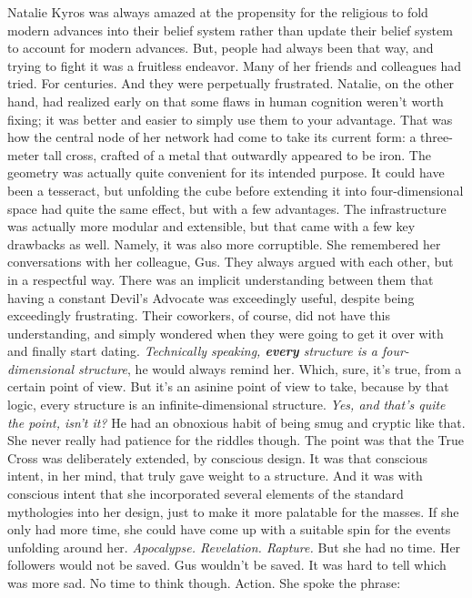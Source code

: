 Natalie Kyros was always amazed at the propensity for the religious to fold modern advances into their belief system rather than update their belief system to account for modern advances. But, people had always been that way, and trying to fight it was a fruitless endeavor. Many of her friends and colleagues had tried. For centuries. And they were perpetually frustrated.
\SmallVSpace
Natalie, on the other hand, had realized early on that some flaws in human cognition weren’t worth fixing; it was better and easier to simply use them to your advantage. That was how the central node of her network had come to take its current form: a three-meter tall cross, crafted of a metal that outwardly appeared to be iron.
\SmallVSpace
The geometry was actually quite convenient for its intended purpose. It could have been a tesseract, but unfolding the cube before extending it into four-dimensional space had quite the same effect, but with a few advantages. The infrastructure was actually more modular and extensible, but that came with a few key drawbacks as well. Namely, it was also more corruptible.
\SmallVSpace
She remembered her conversations with her colleague, Gus. They always argued with each other, but in a respectful way. There was an implicit understanding between them that having a constant Devil’s Advocate was exceedingly useful, despite being exceedingly frustrating. Their coworkers, of course, did not have this understanding, and simply wondered when they were going to get it over with and finally start dating.
\SmallVSpace
\emph{Technically speaking, \textbf{every} structure is a four-dimensional structure}, he would always remind her. Which, sure, it’s true, from a certain point of view. But it’s an asinine point of view to take, because by that logic, every structure is an infinite-dimensional structure. \emph{Yes, and that’s quite the point, isn’t it?}
\SmallVSpace
He had an obnoxious habit of being smug and cryptic like that. She never really had patience for the riddles though. The point was that the True Cross was deliberately extended, by conscious design. It was that conscious intent, in her mind, that truly gave weight to a structure.
\SmallVSpace
And it was with conscious intent that she incorporated several elements of the standard mythologies into her design, just to make it more palatable for the masses. If she only had more time, she could have come up with a suitable spin for the events unfolding around her. \emph{Apocalypse. Revelation. Rapture.}
\SmallVSpace
But she had no time. Her followers would not be saved. Gus wouldn’t be saved. It was hard to tell which was more sad. No time to think though. Action. She spoke the phrase:
